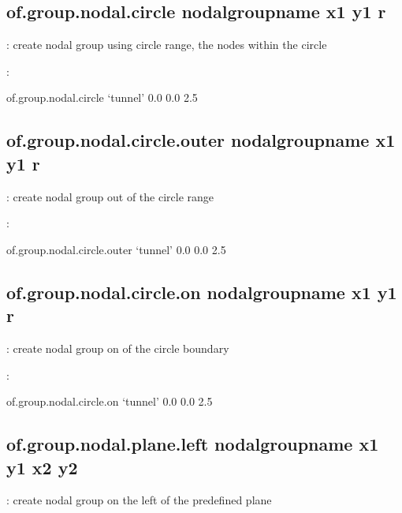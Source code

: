 \documentclass[letterpaper,10pt,english]{sphinxmanual}
\begin{document}
\subsection{of.group.nodal.circle nodalgroupname x1 y1 r}
\label{\detokenize{rst_tutorials/command_line_guide:of-group-nodal-circle-nodalgroupname-x1-y1-r}}
: create nodal group using circle range, the nodes within the
circle

:

\begin{sphinxVerbatim}[commandchars=\\\{\}]
of.group.nodal.circle ‘tunnel’ 0.0 0.0 2.5
\end{sphinxVerbatim}


\subsection{of.group.nodal.circle.outer nodalgroupname x1 y1 r}
\label{\detokenize{rst_tutorials/command_line_guide:of-group-nodal-circle-outer-nodalgroupname-x1-y1-r}}
: create nodal group out of the circle range

:

\begin{sphinxVerbatim}[commandchars=\\\{\}]
of.group.nodal.circle.outer ‘tunnel’ 0.0 0.0 2.5
\end{sphinxVerbatim}


\subsection{of.group.nodal.circle.on nodalgroupname x1 y1 r}
\label{\detokenize{rst_tutorials/command_line_guide:of-group-nodal-circle-on-nodalgroupname-x1-y1-r}}
: create nodal group on of the circle boundary

:

\begin{sphinxVerbatim}[commandchars=\\\{\}]
of.group.nodal.circle.on ‘tunnel’ 0.0 0.0 2.5
\end{sphinxVerbatim}


\subsection{of.group.nodal.plane.left nodalgroupname x1 y1 x2 y2}
\label{\detokenize{rst_tutorials/command_line_guide:of-group-nodal-plane-left-nodalgroupname-x1-y1-x2-y2}}
: create nodal group on the left of the predefined plane
\end{document}
